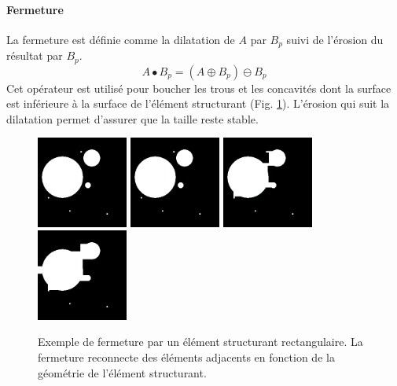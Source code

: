 \paragraph{Fermeture}
La fermeture est définie comme la dilatation de $A$ par $B_p$ suivi de l'érosion du résultat par $B_p$.
\begin{equation}
 A \bullet B_p = (A \oplus B_p) \ominus B_p
\end{equation}  
Cet opérateur est utilisé pour boucher les trous et les concavités dont la surface est inférieure à la surface de l'élément structurant (Fig. \ref{fig:morpho_femerture}). L'érosion qui suit la dilatation permet d'assurer que la taille reste stable.
\begin{figure}[!ht]
  \centering
  \includegraphics[height=3cm]{Images/morpho_init.png}
  \includegraphics[height=3cm]{Images/morpho_close_k5.png}
  \includegraphics[height=3cm]{Images/morpho_close_k21.png}
  \includegraphics[height=3cm]{Images/morpho_close_k31.png}
  \caption{Exemple de fermeture par un élément structurant rectangulaire. La fermeture reconnecte des éléments adjacents en fonction de la géométrie de l'élément structurant.}
  \label{fig:morpho_femerture}
\end{figure}

